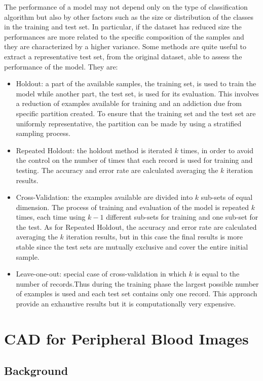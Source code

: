 \documentclass[final,a4paper,12pt,english]{UnicaPhdThesis3}
\begin{document}
The performance of a model may not depend only on the type of classification algorithm but also by other factors such as the size or distribution of the classes in the training and test set. In particular, if the dataset has reduced size the performances are more related to the specific composition of the samples and they are characterized by a higher variance. Some methods are quite useful to extract a representative test set, from the original dataset, able to assess the performance of the model. They are:
\begin{itemize}
\item Holdout: a part of the available samples, the training set, is used to train the model while another part, the test set, is used for its evaluation. This involves a reduction of examples available for training and an addiction due from specific partition created. To ensure that the training set and the test set are uniformly representative, the partition can be made by using a stratified sampling process.
\item Repeated Holdout: the holdout method is iterated $k$ times, in order to avoid the control on the number of times that each record is used for training and testing. The accuracy and error rate are calculated averaging the $k$ iteration results.
\item Cross-Validation: the examples available are divided into $k$ sub-sets of equal dimension. The process of training and evaluation of the model is repeated $k$ times, each time using $k-1$ different sub-sets for training and one sub-set
for the test. As for Repeated Holdout, the accuracy and error rate are calculated averaging the $k$ iteration results, but in this case the final results is more stable since the test sets are mutually exclusive and cover the entire initial sample.
\item Leave-one-out: special case of cross-validation in which $k$ is equal to the number of records.Thus during the training phase the largest possible number of examples is used and each test set contains only one record. This approach provide an exhaustive results but it is computationally very expensive.
\end{itemize}


\part{CAD for Peripheral Blood Images} \label{due}

\chapter{Background}
\end{document}
